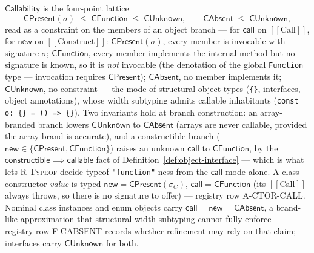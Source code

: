 \documentclass[11pt]{article}
\begin{document}
\begin{definition}[Callability]
\label{def:callability}
$\mathsf{Callability}$ is the four-point lattice
\[
\mathsf{CPresent}(\sigma) \;\le\; \mathsf{CFunction} \;\le\;
\mathsf{CUnknown},
\qquad
\mathsf{CAbsent} \;\le\; \mathsf{CUnknown},
\]
read as a constraint on the members of an object branch — for
$\mathsf{call}$ on $[[\mathrm{Call}]]$, for $\mathsf{new}$ on
$[[\mathrm{Construct}]]$:
$\mathsf{CPresent}(\sigma)$, every member is invocable with signature
$\sigma$; $\mathsf{CFunction}$, every member implements the internal
method but no signature is known, so it is \emph{not} invocable (the
denotation of the global \texttt{Function} type — invocation requires
$\mathsf{CPresent}$); $\mathsf{CAbsent}$, no member implements it;
$\mathsf{CUnknown}$, no constraint — the mode of structural object types
(\texttt{\{\}}, interfaces, object annotations), whose width subtyping
admits callable inhabitants (\texttt{const o: \{\} = () => \{\}}).
Two invariants hold at branch construction: an array-branded branch
lowers $\mathsf{CUnknown}$ to $\mathsf{CAbsent}$ (arrays are never
callable, provided the array brand is accurate), and a
constructible branch
($\mathsf{new} \in \{\mathsf{CPresent}, \mathsf{CFunction}\}$) raises an
unknown $\mathsf{call}$ to $\mathsf{CFunction}$, by the
$\mathsf{constructible} \implies \mathsf{callable}$ fact of
Definition~\ref{def:object-interface} — which is what lets
\textsc{R-Typeof} decide typeof-\texttt{"function"}-ness from the
$\mathsf{call}$ mode alone. A class-constructor \emph{value} is typed
$\mathsf{new} = \mathsf{CPresent}(\sigma_C)$,
$\mathsf{call} = \mathsf{CFunction}$ (its $[[\mathrm{Call}]]$ always
throws, so there is no signature to offer) — registry row A-CTOR-CALL.
Nominal class instances and enum objects carry
$\mathsf{call} = \mathsf{new} = \mathsf{CAbsent}$, a brand-like
approximation that structural width subtyping cannot fully enforce —
registry row F-CABSENT records whether refinement may rely on that claim;
interfaces carry $\mathsf{CUnknown}$ for both.
\end{definition}
\end{document}
